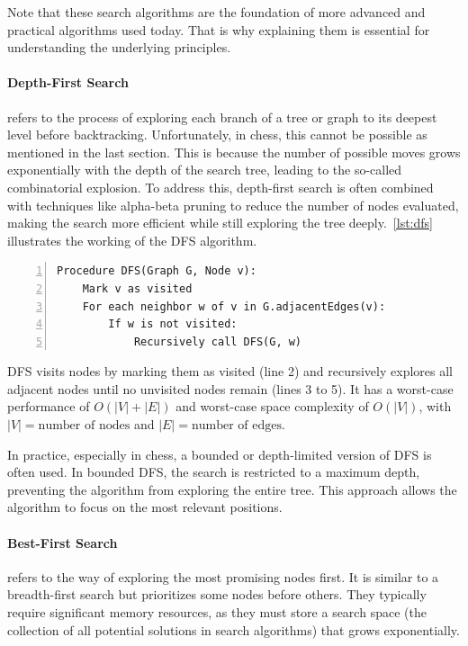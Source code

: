 \noindent Note that these search algorithms are the foundation of more advanced and practical algorithms used today. That is why explaining them is essential for understanding the underlying principles.

\paragraph{Depth-First Search} refers to the process of exploring each branch of a tree or graph to its deepest level before backtracking. Unfortunately, in chess, this cannot be possible as mentioned in the last section. This is because the number of possible moves grows exponentially with the depth of the search tree, leading to the so-called combinatorial explosion. To address this, depth-first search is often combined with techniques like alpha-beta pruning to reduce the number of nodes evaluated, making the search more efficient while still exploring the tree deeply.~\cref{lst:dfs} illustrates the working of the DFS algorithm.

\vspace{1em}

\begin{lstlisting}[caption={Pseudocode of the Depth-First Search algorithm~\cite{CLRS}.}, label={lst:dfs}, frame=single, numbers=left, xleftmargin=15pt, captionpos=b]
Procedure DFS(Graph G, Node v):
    Mark v as visited
    For each neighbor w of v in G.adjacentEdges(v):
        If w is not visited:
            Recursively call DFS(G, w)
\end{lstlisting}

\vspace{1em}

\noindent DFS visits nodes by marking them as visited (line 2) and recursively explores all adjacent nodes until no unvisited nodes remain (lines 3 to 5). It has a worst-case performance of $O(|V| + |E|)$ and worst-case space complexity of $O(|V|)$, with $|V| = \text{number of nodes}$ and $|E| = \text{number of edges}$.

\vspace{1em}

\noindent In practice, especially in chess, a bounded or depth-limited version of DFS is often used. In bounded DFS, the search is restricted to a maximum depth, preventing the algorithm from exploring the entire tree. This approach allows the algorithm to focus on the most relevant positions.

\paragraph{Best-First Search} refers to the way of exploring the most promising nodes first. It is similar to a breadth-first search but prioritizes some nodes before others. They typically require significant memory resources, as they must store a search space (the collection of all potential solutions in search algorithms) that grows exponentially.


